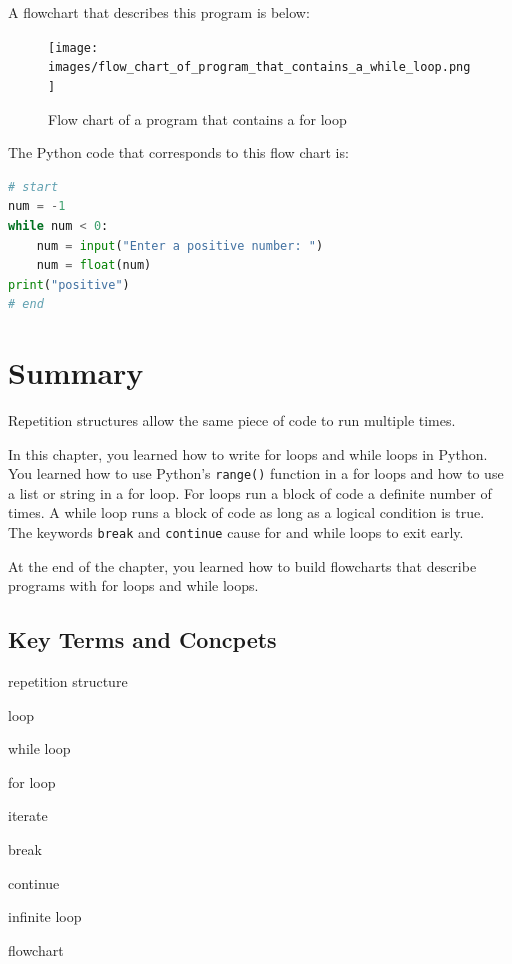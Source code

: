 \documentclass{book}
\newenvironment{key_terms}{\begin{multicols}{3}}{\end{multicols}} %
\begin{document}
A flowchart that describes this program is below:

\begin{figure}
\centering
\texttt{[image: images/flow\_chart\_of\_program\_that\_contains\_a\_while\_loop.png]}
\caption{Flow chart of a program that contains a for loop}
\end{figure}

The Python code that corresponds to this flow chart is:

\begin{lstlisting}[language=Python]
# start
num = -1
while num < 0:
    num = input("Enter a positive number: ")
    num = float(num)
print("positive")
# end
\end{lstlisting}
    




    
        \newpage
        \section{Summary}\label{summary}

    




    
        Repetition structures allow the same piece of code to run multiple
times.

In this chapter, you learned how to write for loops and while loops in
Python. You learned how to use Python's \lstinline!range()! function in
a for loops and how to use a list or string in a for loop. For loops run
a block of code a definite number of times. A while loop runs a block of
code as long as a logical condition is true. The keywords
\lstinline!break! and \lstinline!continue! cause for and while loops to
exit early.

At the end of the chapter, you learned how to build flowcharts that
describe programs with for loops and while loops.
    




    
        \subsection{Key Terms and Concpets}\label{key-terms-and-concpets}
    




    
        \begin{key_terms}
        repetition structure

loop

while loop

for loop

iterate

break

continue

infinite loop

flowchart
        \end{key_terms}
\end{document}
